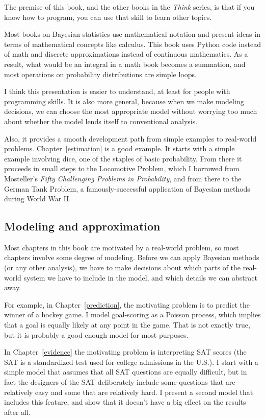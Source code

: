 \documentclass[12pt]{book}
\begin{document}
The premise of this book, and the other books in the {\it Think}
series, is that if you know how to program, you
can use that skill to learn other topics.

Most books on Bayesian statistics use mathematical notation and
present ideas in terms of mathematical concepts like calculus.
This book uses Python code instead of math and discrete approximations
instead of continuous mathematics.  As a result, what would
be an integral in a math book becomes a summation, and
most operations on probability distributions are simple loops.

I think this presentation is easier to understand, at least for people with
programming skills.  It is also more general, because when we make
modeling decisions, we can choose the most appropriate model without
worrying too much about whether the model lends itself to conventional
analysis.

Also, it provides a smooth development path from
simple examples to real-world problems.  Chapter~\ref{estimation} is a
good example.  It starts with a simple example involving dice, one of
the staples of basic probability.  From there it proceeds in small
steps to the Locomotive Problem, which I borrowed from Mosteller's
{\it Fifty Challenging Problems in Probability}, and from there to the
German Tank Problem, a famously-successful application of Bayesian
methods during World War II.


\subsection{Modeling and approximation}

Most chapters in this book are motivated by a real-world problem,
so most chapters involve some degree of modeling.   Before we
can apply Bayesian methods (or any other analysis), we have to
make decisions about which parts of the real-world system we
have to include in the model, and which details we can abstract
away.

For example, in Chapter~\ref{prediction}, the motivating problem is to
predict the winner of a hockey game.  I model goal-scoring as a
Poisson process, which implies that a goal is equally likely at any
point in the game.  That is not exactly true, but it is probably a
good enough model for most purposes.

In Chapter~\ref{evidence} the motivating problem is interpreting SAT
scores (the SAT is a standardized test used for college admissions in
the U.S.).  I start with a simple model that assumes that all SAT
questions are equally difficult, but in fact the designers of the SAT
deliberately include some questions that are relatively easy and some
that are relatively hard.  I present a second model that includes this
feature, and show that it doesn't have a big effect on the results
after all.
\end{document}
